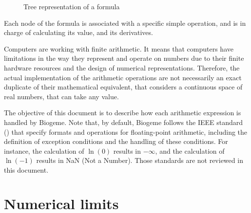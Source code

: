 \documentclass[12pt,a4paper]{article}
\begin{document}
\begin{figure}[htb]
  \begin{center}
  \end{center}
\caption{\label{fig:tree}Tree representation of a formula}
\end{figure}

Each node of the formula is associated with a specific simple
operation, and is in charge of calculating its value, and its
derivatives.


Computers are working with finite arithmetic. It means that computers
have limitations in the way they represent and operate on numbers due
to their finite hardware resources and the design of numerical
representations.  Therefore, the actual implementation of the
arithmetic operations are not necessarily an exact duplicate of their
mathematical equivalent, that considers a continuous space of real
numbers, that can take any value.

The objective of this document is to describe how each arithmetic expression is handled by Biogeme.
Note that, by default, Biogeme follows the IEEE standard (\cite{IEEE:2019aa}) that specify formats and operations for floating-point arithmetic, including the definition of exception conditions
and the handling of these conditions. For instance,  the calculation of $\ln(0)$  results in
$-\infty$, and the calculation of $\ln(-1)$ results in NaN (Not a Number). Those standards are not reviewed in this document.

\section{Numerical limits}
\end{document}
